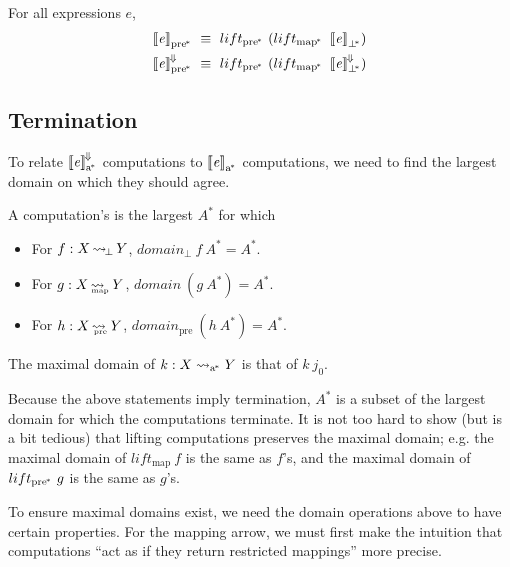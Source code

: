 \documentclass{llncs}
\newcommand{\arrow}{\rightsquigarrow}
\newcommand{\conv}{^{\mspace{-2mu}\Downarrow\mspace{-2mu}}}
\newcommand{\meaningofconv}[1]{\left\llbracket{#1}\right\rrbracket\conv}
\newcommand{\arrowlift}{\ensuremath{lift}}
\newcommand{\genc}{_\mathrm{a^{\mspace{-2mu}*}}}
\DeclareMathOperator{\botto}{\arrow_{\mspace{-3mu}\bot}}
\newcommand{\map}{_\mathrm{map}}
\DeclareMathOperator{\mapto}{\arrow_{\mspace{-21mu}\map}}
\newcommand{\liftmap}{\arrowlift\map}
\newcommand{\pre}{_\mathrm{pre}}
\DeclareMathOperator{\preto}{\arrow_{\mspace{-19mu}\pre}}
\newcommand{\pbot}{{\bot^{\mspace{-4mu}*}}}
\newcommand{\pmap}{_\mathrm{map^{\mspace{-2mu}*}}}
\newcommand{\liftpmap}{\arrowlift\pmap}
\newcommand{\ppre}{_\mathrm{pre^{\mspace{-2mu}*}}}
\newcommand{\liftppre}{\arrowlift\ppre}
\begin{document}
\begin{corollary}
For all expressions $\mathit{e}$,
\begin{equation}
\begin{aligned}
	\meaningof{\mathit{e}}\ppre &\ \equiv \ \liftppre~(\liftpmap~\meaningof{\mathit{e}}_\pbot)
\\
	\meaningofconv{\mathit{e}}\ppre &\ \equiv \ \liftppre~(\liftpmap~\meaningofconv{\mathit{e}}_\pbot)
\end{aligned}
\end{equation}
\end{corollary}

\subsection{Termination}

To relate $\meaningofconv{\mathit{e}}\genc$ computations to $\meaningof{\mathit{e}}\genc$ computations, we need to find the largest domain on which they should agree.

\begin{definition}
\label{def:maximal-domain}
A computation's  is the largest $A^*$ for which
\begin{itemize}
	\item For $f : X \botto Y$, $domain_\bot~f~A^* = A^*$.
	\item For $g : X \mapto Y$, $domain~(g~A^*) = A^*$.
	\item For $h : X \preto Y$, $domain\pre~(h~A^*) = A^*$.
\end{itemize}
The maximal domain of $k : X \arrow\genc Y$ is that of $k~j_0$.%
\end{definition}

Because the above statements imply termination, $A^*$ is a subset of the largest domain for which the computations terminate.
It is not too hard to show (but is a bit tedious) that lifting computations preserves the maximal domain; e.g. the maximal domain of $\liftmap~f$ is the same as $f$'s, and the maximal domain of $\liftppre~g$ is the same as $g$'s.

To ensure maximal domains exist, we need the domain operations above to have certain properties.
For the mapping arrow, we must first make the intuition that computations ``act as if they return restricted mappings'' more precise.
\end{document}

